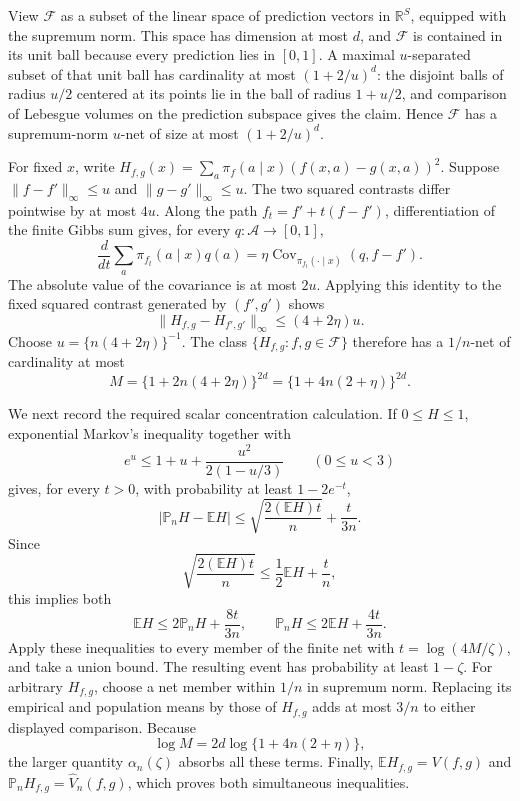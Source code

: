 View \(\mathcal F\) as a subset of the linear space of prediction vectors in \(\mathbb R^S\), equipped with the supremum norm. This space has dimension at most \(d\), and \(\mathcal F\) is contained in its unit ball because every prediction lies in \([0,1]\). A maximal \(u\)-separated subset of that unit ball has cardinality at most \((1+2/u)^d\): the disjoint balls of radius \(u/2\) centered at its points lie in the ball of radius \(1+u/2\), and comparison of Lebesgue volumes on the prediction subspace gives the claim. Hence \(\mathcal F\) has a supremum-norm \(u\)-net of size at most \((1+2/u)^d\).

For fixed \(x\), write \(H_{f,g}(x)=\sum_a\pi_f(a\mid x)(f(x,a)-g(x,a))^2\). Suppose \(\|f-f'\|_\infty\le u\) and \(\|g-g'\|_\infty\le u\). The two squared contrasts differ pointwise by at most \(4u\). Along the path \(f_t=f'+t(f-f')\), differentiation of the finite Gibbs sum gives, for every \(q:\mathcal A\to[0,1]\),
\[
\frac{d}{dt}\sum_a\pi_{f_t}(a\mid x)q(a)
=\eta\operatorname{Cov}_{\pi_{f_t}(\cdot\mid x)}(q,f-f').
\]
The absolute value of the covariance is at most \(2u\). Applying this identity to the fixed squared contrast generated by \((f',g')\) shows
\[
\|H_{f,g}-H_{f',g'}\|_\infty\le(4+2\eta)u.
\]
Choose \(u=\{n(4+2\eta)\}^{-1}\). The class \(\{H_{f,g}:f,g\in\mathcal F\}\) therefore has a \(1/n\)-net of cardinality at most
\[
M=\{1+2n(4+2\eta)\}^{2d}=\{1+4n(2+\eta)\}^{2d}.
\]

We next record the required scalar concentration calculation. If \(0\le H\le1\), exponential Markov's inequality together with
\[
e^u\le1+u+\frac{u^2}{2(1-u/3)}\qquad(0\le u<3)
\]
gives, for every \(t>0\), with probability at least \(1-2e^{-t}\),
\[
|\mathbb P_nH-\mathbb EH|
\le\sqrt{\frac{2(\mathbb EH)t}{n}}+\frac{t}{3n}.
\]
Since
\[
\sqrt{\frac{2(\mathbb EH)t}{n}}
\le\frac12\mathbb EH+\frac tn,
\]
this implies both
\[
\mathbb EH\le2\mathbb P_nH+\frac{8t}{3n},
\qquad
\mathbb P_nH\le2\mathbb EH+\frac{4t}{3n}.
\]
Apply these inequalities to every member of the finite net with \(t=\log(4M/\zeta)\), and take a union bound. The resulting event has probability at least \(1-\zeta\). For arbitrary \(H_{f,g}\), choose a net member within \(1/n\) in supremum norm. Replacing its empirical and population means by those of \(H_{f,g}\) adds at most \(3/n\) to either displayed comparison. Because
\[
\log M=2d\log\{1+4n(2+\eta)\},
\]
the larger quantity \(\alpha_n(\zeta)\) absorbs all these terms. Finally, \(\mathbb EH_{f,g}=V(f,g)\) and \(\mathbb P_nH_{f,g}=\widehat V_n(f,g)\), which proves both simultaneous inequalities.